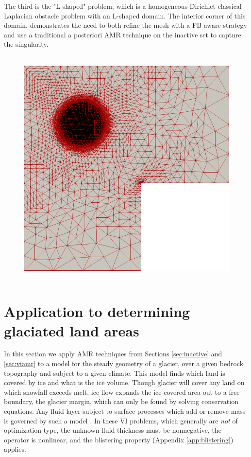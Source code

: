 \documentclass[]{interact}
\theoremstyle{plain}%
\theoremstyle{definition}
\theoremstyle{remark}
\begin{document}
The third is the "L-shaped" problem, which is a homogeneous Dirichlet classical Laplacian obstacle problem with an L-shaped domain. The interior corner of this domain, demonstrates the need to both refine the mesh with a FB aware strategy and use a traditional a posteriori AMR technique on the inactive set to capture the singularity. 


\begin{figure}[ht]
\centering
\mbox{
\includegraphics[width = .70\textwidth]{meshfigs/lshaped.png}
}
\caption{}
\label{fig:lshapedmeshfig}
\end{figure}






\section{Application to determining glaciated land areas} \label{sec:app}

In this section we apply AMR techniques from Sections \ref{sec:inactive} and \ref{sec:viamr} to a model for the steady geometry of a glacier, over a given bedrock topography and subject to a given climate.  This model finds which land is covered by ice and what is the ice volume.  Though glacier will cover any land on which snowfall exceeds melt, ice flow expands the ice-covered area out to a free boundary, the glacier margin, which can only be found by solving conservation equations.  Any fluid layer subject to surface processes which add or remove mass is governed by such a model \cite{Bueler2021b}.  In these VI problems, which generally are \emph{not} of optimization type, the unknown fluid thickness must be nonnegative, the operator is nonlinear, and the blistering property (Appendix \ref{app:blistering}) applies.
\end{document}
